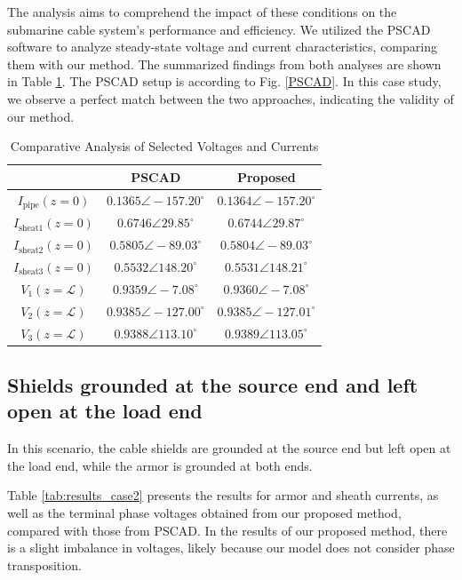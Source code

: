 \documentclass[journal,transmag]{IEEEtran}
\begin{document}
The analysis aims to comprehend the impact of these conditions on the submarine cable system's performance and efficiency. We utilized the PSCAD software to analyze steady-state voltage and current characteristics, comparing them with our method. The summarized findings from both analyses are shown in Table \ref{tab:results}. The PSCAD setup is according to Fig. \ref{PSCAD}.
In this case study, we observe a perfect match between the two approaches, indicating the validity of our method.

\begin{table}[h]
    \centering
    \caption{Comparative Analysis of Selected Voltages and Currents}
    \begin{tabular}{@{}ccc@{}}
    \toprule
    & \textbf{PSCAD} & \textbf{Proposed} \\
    \midrule
    \(I_{\text{pipe}} (z=0)\) & \(0.1365 \angle -157.20^\circ\) & \(0.1364 \angle -157.20^\circ\) \\
    \(I_{\text{sheat}1} (z=0)\) & \(0.6746 \angle 29.85^\circ\) & \(0.6744 \angle 29.87^\circ\) \\
    \(I_{\text{sheat}2} (z=0)\) & \(0.5805 \angle -89.03^\circ\) & \(0.5804 \angle -89.03^\circ\) \\
    \(I_{\text{sheat}3} (z=0)\) & \(0.5532 \angle 148.20^\circ\) & \(0.5531 \angle 148.21^\circ\) \\
    \(V_1 (z=\mathscr{L})\) & \(0.9359 \angle -7.08^\circ\) & \(0.9360 \angle -7.08^\circ\) \\
    \(V_2 (z=\mathscr{L})\) & \(0.9385 \angle -127.00^\circ\) & \(0.9385 \angle -127.01^\circ\) \\
    \(V_3 (z=\mathscr{L})\) & \(0.9388 \angle 113.10^\circ\) & \(0.9389 \angle 113.05^\circ\) \\
    \bottomrule
    \end{tabular}
    \label{tab:results}
\end{table}

\subsection{Shields grounded at the source end and left open at the load end}

In this scenario, the cable shields are grounded at the source end but left open at the load end, while the armor is grounded at both ends.

Table \ref{tab:results_case2} presents the results for armor and sheath currents, as well as the terminal phase voltages obtained from our proposed method, compared with those from PSCAD. In the results of our proposed method, there is a slight imbalance in voltages, likely because our model does not consider phase transposition.
\end{document}
